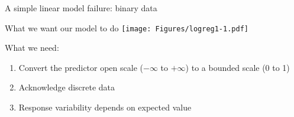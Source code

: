 \documentclass[10pt]{beamer}
\begin{document}
\begin{frame}{A simple linear model failure: binary data}

\centering
{}


\end{frame}

\begin{frame}{What we want our model to do}
\centering
\texttt{[image: Figures/logreg1-1.pdf]}

\begin{block}{What we need:}
  \begin{enumerate}[<+->]
    \item Convert the predictor open scale ($-\infty$ to $+\infty$) to a bounded scale (0 to 1)
    \item Acknowledge discrete data
    \item Response variability depends on expected value
  \end{enumerate}
\end{block}
\end{frame}
\end{document}
